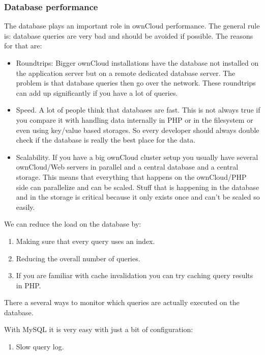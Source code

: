 \documentclass[letterpaper,10pt,english]{sphinxmanual}
\begin{document}
\subsubsection{Database performance}
\label{general/performance:database-performance}
The database plays an important role in ownCloud performance. The general rule is: database queries are very bad and should be avoided if possible. The reasons for that are:
\begin{itemize}
\item {} 
Roundtrips: Bigger ownCloud installations have the database not installed on the application server but on a remote dedicated database server. The problem is that database queries then go over the network. These roundtrips can add up significantly if you have a lot of queries.

\item {} 
Speed. A lot of people think that databases are fast. This is not always true if you compare it with handling data internally in PHP or in the filesystem or even using key/value based storages. So every developer should always double check if the database is really the best place for the data.

\item {} 
Scalability. If you have a big ownCloud cluster setup you usually have several ownCloud/Web servers in parallel and a central database and a central storage. This means that everything that happens on the ownCloud/PHP side can parallelize and can be scaled. Stuff that is happening in the database and in the storage is critical because it only exists once and can't be scaled so easily.

\end{itemize}

We can reduce the load on the database by:
\begin{enumerate}
\item {} 
Making sure that every query uses an index.

\item {} 
Reducing the overall number of queries.

\item {} 
If you are familiar with cache invalidation you can try caching query results in PHP.

\end{enumerate}

There a several ways to monitor which queries are actually executed on the database.

With MySQL it is very easy with just a bit of configuration:
\begin{enumerate}
\item {} 
Slow query log.

\end{enumerate}
\end{document}
